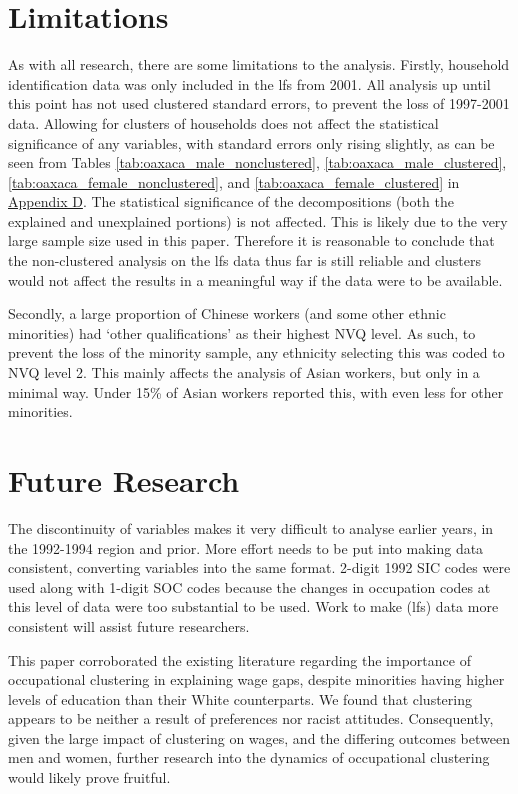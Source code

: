 \documentclass[class=article, crop=false]{standalone}
\begin{document}
\section{Limitations}
\label{sec:limitations}
As with all research, there are some limitations to the analysis. Firstly, household identification data was only included in the \acrlong{lfs} from 2001. All analysis up until this point has not used clustered standard errors, to prevent the loss of 1997-2001 data. Allowing for clusters of households does not affect the statistical significance of any variables, with standard errors only rising slightly, as can be seen from Tables \ref{tab:oaxaca_male_nonclustered}, \ref{tab:oaxaca_male_clustered},  \ref{tab:oaxaca_female_nonclustered}, and \ref{tab:oaxaca_female_clustered} in \hyperref[sec:appendixD]{Appendix D}. The statistical significance of the decompositions (both the explained and unexplained portions) is not affected. This is likely due to the very large sample size used in this paper. Therefore it is reasonable to conclude that the non-clustered analysis on the \acrshort{lfs} data thus far is still reliable and clusters would not affect the results in a meaningful way if the data were to be available.

Secondly, a large proportion of Chinese workers (and some other ethnic minorities) had \enquote*{other qualifications} as their highest NVQ level. As such, to prevent the loss of the minority sample, any ethnicity selecting this was coded to NVQ level 2. This mainly affects the analysis of Asian workers, but only in a minimal way. Under 15\% of Asian workers reported this, with even less for other minorities.

\section{Future Research}
\label{sec:Future Research}
The discontinuity of variables makes it very difficult to analyse earlier years, in the 1992-1994 region and prior. More effort needs to be put into making data consistent, converting variables into the same format. 2-digit 1992 SIC codes were used along with 1-digit SOC codes because the changes in occupation codes at this level of data were too substantial to be used. Work to make (\acrshort{lfs}) data more consistent will assist future researchers.

This paper corroborated the existing literature regarding the importance of occupational clustering in explaining wage gaps, despite minorities having higher levels of education than their White counterparts. We found that clustering appears to be neither a result of preferences nor racist attitudes. Consequently, given the large impact of clustering on wages, and the differing outcomes between men and women, further research into the dynamics of occupational clustering would likely prove fruitful.
\end{document}

